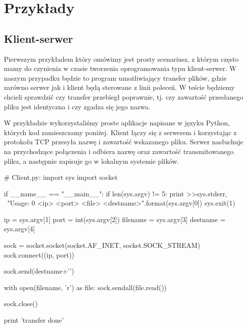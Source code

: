 \documentclass[00-praca-magisterska.tex]{subfiles}
\begin{document}
\chapter{Przykłady}

\section{Klient-serwer}

Pierwszym przykładem który omówimy jest prosty scenariusz, z którym często mamy
do czynienia w czasie tworzenia oprogramowania typu klient-serwer. W naszym
przypadku będzie to program umożliwiający transfer plików, gdzie zarówno serwer
jak i klient będą sterowane z linii poleceń. W teście będziemy chcieli sprawdzić
czy transfer przebiegł poprawnie, tj. czy zawartość przesłanego pliku jest
identyczna i czy zgadza się jego nazwa.

W przykładzie wykorzystaliśmy proste aplikacje napisane w języku Python, których
kod zamieszczamy poniżej. Klient łączy się z serwerem i korzystając z protokołu
TCP przesyła nazwę i zawartość wskazanego pliku. Serwer nasłuchuje na
przychodzące połączenia i odbiera nazwę oraz zawartość transmitowanego pliku, a
następnie zapisuje go w lokalnym systemie plików.

\begin{pythoncode}
  # Client.py:
  import sys
  import socket

  if __name__ == "__main__":
      if len(sys.argv) != 5:
	  print >>sys.stderr, \
	      "Usage: {0} <ip> <port> <file> <destname>".format(sys.argv[0])
	  sys.exit(1)

      ip = sys.argv[1]
      port = int(sys.argv[2])
      filename = sys.argv[3]
      destname = sys.argv[4]

      sock = socket.socket(socket.AF_INET, socket.SOCK_STREAM)
      sock.connect((ip, port))

      sock.send(destname+'\n')

      with open(filename, 'r') as file:
          sock.sendall(file.read())

      sock.close()

      print 'transfer done'

\end{pythoncode}
\end{document}
